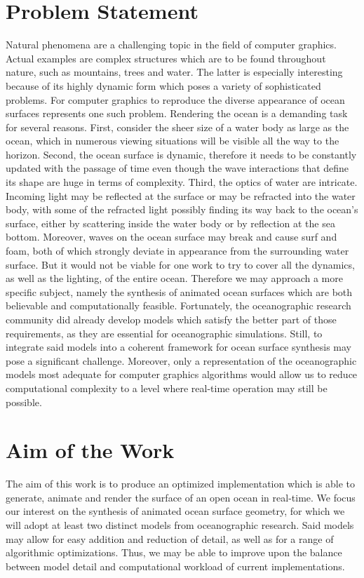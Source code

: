 \documentclass[a4paper,11pt,twoside]{memoir}
\begin{document}
\section{Problem Statement}
Natural phenomena are a challenging topic in the field of computer graphics.
Actual examples are complex structures which are to be found throughout nature,
such as mountains, trees and water. The latter is especially interesting
because of its highly dynamic form which poses a variety of sophisticated problems.
For computer graphics to reproduce the diverse appearance of ocean surfaces
represents one such problem.
Rendering the ocean is a demanding task for several reasons. First, consider the
sheer size of a water body as large as the ocean, which in numerous viewing
situations will be visible all the way to the horizon. Second, the ocean surface
is dynamic, therefore it needs to be constantly updated with the passage of time
even though the wave interactions that define its shape are huge in terms of complexity.
Third, the optics of water are intricate. Incoming light may be reflected at the
surface or may be refracted into the water body, with some of the refracted light
possibly finding its way back to the ocean's surface, either by scattering inside the water
body or by reflection at the sea bottom. Moreover, waves on the ocean surface may
break and cause surf and foam, both of which strongly deviate in appearance from
the surrounding water surface.
But it would not be viable for one work to try to cover all the dynamics, as well
as the lighting, of the entire ocean. Therefore we may approach a more specific
subject, namely the synthesis of animated ocean surfaces which are both believable
and computationally feasible. 
Fortunately, the oceanographic research community did already develop models
\citep[e.g.\ ][]{article:PiersonMoskowitz1964, article:Hasselman1973} which satisfy the
better part of those requirements, as they are essential for oceanographic simulations.
Still, to integrate said models into a coherent framework for ocean surface
synthesis may pose a significant challenge.
Moreover, only a representation of the oceanographic models most adequate for
computer graphics algorithms would allow us to reduce computational complexity to
a level where real-time operation may still be possible.
\section{Aim of the Work}
The aim of this work is to produce an optimized implementation which is able to generate,
animate and render the surface of an open ocean in real-time. We focus our interest
on the synthesis of animated ocean surface geometry, for which we will adopt
at least two distinct models from oceanographic research. Said models may allow for
easy addition and reduction of detail, as well as for a range of algorithmic
optimizations. Thus, we may be able to improve upon the balance between model detail
and computational workload of current implementations.
%
\end{document}
